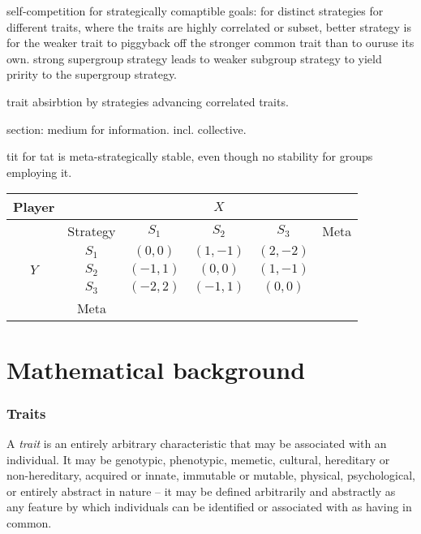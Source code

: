 \documentclass[twocolumn, aps, rmp, amsmath, amssymb, nofootinbib, superscriptaddress, longbibliography, floatfix, table-of-contents, eqsecnum]{revtex4-1}
\begin{document}
self-competition for strategically comaptible goals:
for distinct strategies for different traits, where the traits are highly correlated or subset, better strategy is for the weaker trait to piggyback off the stronger common trait than to ouruse its own. strong supergroup strategy leads to weaker subgroup strategy to yield pririty to the supergroup strategy.

trait absirbtion by strategies advancing correlated traits. 

section: medium for information. incl. collective.

tit for tat is meta-strategically stable, even though no stability for groups employing it.

\begin{table}[!htbp]
\begin{tabular}{|c|c|c|c|c|c|}
\hline
Player               &          & \multicolumn{3}{c|}{$X$}       &      \\ \hline
                     & Strategy & $S_1$    & $S_2$    & $S_3$    & Meta \\ \hline
\multirow{3}{*}{$Y$} & $S_1$    & $(0,0)$  & $(1,-1)$ & $(2,-2)$ &      \\ \cline{2-6} 
                     & $S_2$    & $(-1,1)$ & $(0,0)$  & $(1,-1)$ &      \\ \cline{2-6} 
                     & $S_3$    & $(-2,2)$ & $(-1,1)$ & $(0,0)$  &      \\ \hline
                     & Meta     &          &          &          &      \\ \hline
\end{tabular}
\end{table}

%
%

\part{Mathematical background}

\section{Traits}

A \textit{trait} is an entirely arbitrary characteristic that may be associated with an individual. It may be genotypic, phenotypic, memetic, cultural, hereditary or non-hereditary, acquired or innate, immutable or mutable, physical, psychological, or entirely abstract in nature -- it may be defined arbitrarily and abstractly as any feature by which individuals can be identified or associated with as having in common.
\end{document}

